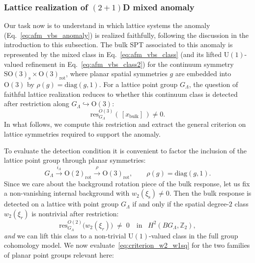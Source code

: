 \documentclass[aps,prx,reprint,superscriptaddress,twocolumn,amsmath,amssymb,amsfonts, nofootinbib]{revtex4-2}
\newcommand{\U}{\text{U}}
\newcommand{\SO}{\text{SO}}
\newcommand{\res}{\text{res}}
\newcommand{\Z}{\mathbb{Z}}
\theoremstyle{apsstyle}
\begin{document}
\subsubsection{Lattice realization of $(2+1)$D mixed anomaly}
\label{sec:afm_vbs_lattice}
Our task now is to understand in which lattice systems the anomaly (Eq.~\ref{eq:afm_vbs_anomaly}) is realized faithfully, following the discussion in the introduction to this subsection. The bulk SPT associated to this anomaly is represented by the mixed class in Eq.~\ref{eq:afm_vbs_class} (and its lifted $\U(1)$-valued refinement in Eq.~\ref{eq:afm_vbs_class2}) for the continuum symmetry $\SO(3)_{\mathrm{s}}\times \mathrm{O}(3)_{\mathrm{rot}}$, where planar spatial symmetries $g$ are embedded into $\mathrm{O}(3)$ by $\rho(g)=\mathrm{diag}(g,1)$. For a lattice point group $G_{\Lambda}$, the question of faithful lattice realization reduces to whether this continuum class is detected after restriction along $G_{\Lambda}\hookrightarrow \mathrm{O}(3)$:
\begin{equation}
    \res^{O(3)}_{G_{\Lambda}}(\,[x_{\mathrm{bulk}}]\,)\neq 0.
    \label{eq:detection_criterion}
\end{equation}
In what follows, we compute this restriction and extract the general criterion on lattice symmetries required to support the anomaly.

\bigskip 

To evaluate the detection condition it is convenient to factor the inclusion of the lattice point group through planar symmetries:
\begin{equation*}
    G_{\Lambda}\xrightarrow{i_{\Lambda}} \mathrm{O}(2)_{\mathrm{rot}}
    \xrightarrow{\ \rho\ } \mathrm{O}(3)_{\mathrm{rot}},
    \qquad \rho(g)=\mathrm{diag}(g, 1).
\end{equation*}
Since we care about the background rotation piece of the bulk response, let us fix a non-vanishing internal background with $w_{2}(\xi_{\mathrm{s}})\neq 0.$ Then the bulk response is detected on a lattice with point group $G_{\Lambda}$ if and only if the spatial degree-$2$ class $w_{2}(\xi_{r})$ is nontrivial after restriction:
\begin{equation}\res_{G_\Lambda}^{O(2)}\bigl(w_{2}(\xi_{r})\bigr)\;\neq\;0
    \quad\text{in}\;\;\;H^{2}(BG_{\Lambda},\Z_{2}),
    \label{eq:criterion_w2_w1sq}
\end{equation}
\textit{and} we can lift this class to a non-trivial $\mathrm{U}(1)$-valued class in the full group cohomology model. We now evaluate~\eqref{eq:criterion_w2_w1sq} for the two families of planar point groups relevant here:
\end{document}
